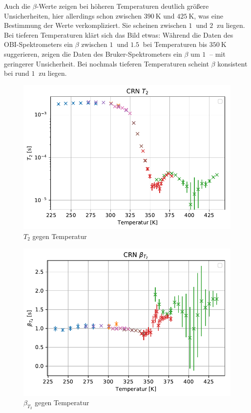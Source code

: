 Auch die $\beta$-Werte zeigen bei höheren Temperaturen deutlich größere Unsicherheiten, hier allerdings schon zwischen $\SI{390}{\kelvin}$ und $\SI{425}{\kelvin}$, was eine Bestimmung der Werte verkompliziert. Sie scheinen zwischen $\SI{1}{}$ und $\SI{2}{}$ zu liegen. Bei tieferen Temperaturen klärt sich das Bild etwas: Während die Daten des OBI-Spektrometers ein $\beta$ zwischen $\SI{1}{}$ und $\SI{1.5}{}$ bei Temperaturen bis $\SI{350}{\kelvin}$ suggerieren, zeigen die Daten des Bruker-Spektrometers ein $\beta$ um $\SI{1}{}$ -- mit geringerer Unsicherheit. Bei nochmals tieferen Temperaturen scheint $\beta$ konsistent bei rund $\SI{1}{}$ zu liegen.

\begin{figure}
	\begin{center}
		\includegraphics[width=\textwidth]{graphics/plots/T2/t2.pdf}
	\end{center}
	\caption{$T_2$ gegen Temperatur} \label{fig:res:T_2}
\end{figure}

\begin{figure}
	\begin{center}
		\includegraphics[width=\textwidth]{graphics/plots/T2/t2_beta.pdf}
	\end{center}
	\caption{$\beta_{T_2}$ gegen Temperatur} \label{fig:res:beta_T_2}
\end{figure}

